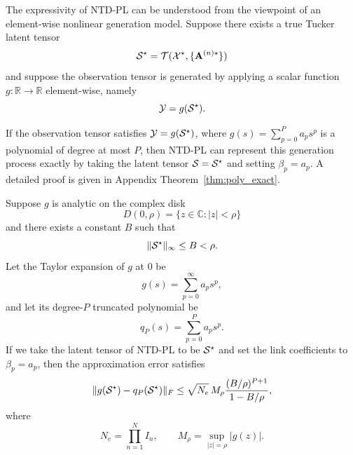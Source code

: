 The expressivity of NTD-PL can be understood from the viewpoint of an element-wise nonlinear generation model. Suppose there exists a true Tucker latent tensor
\begin{equation}
\mathcal{S}^\star
=
\mathcal{T}(\mathcal{X^\star},\{\mathbf{A}^{(n)\star}\})
\end{equation}
and suppose the observation tensor is generated by applying a scalar function $g:\mathbb R\to\mathbb R$ element-wise, namely
\begin{equation}
\mathcal{Y} = g(\mathcal{S}^\star).
\end{equation}

\begin{proposition}
\label{prop:poly_exact_main}
If the observation tensor satisfies $\mathcal{Y} = g(\mathcal{S}^\star)$, where $g(s)=\sum_{p=0}^{P} a_p s^p$ is a polynomial of degree at most $P$, then NTD-PL can represent this generation process exactly by taking the latent tensor $\mathcal{S}=\mathcal{S}^\star$ and setting $\beta_p=a_p$. A detailed proof is given in Appendix Theorem~\ref{thm:poly_exact}.
\end{proposition}

\begin{theorem}
\label{thm:analytic_bound_main}
Suppose $g$ is analytic on the complex disk
\begin{equation}
D(0,\rho)=\{z\in\mathbb C:|z|<\rho\}
\end{equation}
and there exists a constant $B$ such that
\begin{equation}
\|\mathcal{S}^\star\|_\infty \le B < \rho.
\end{equation}
Let the Taylor expansion of $g$ at $0$ be
\begin{equation}
g(s)=\sum_{p=0}^{\infty} a_p s^p,
\end{equation}
and let its degree-$P$ truncated polynomial be
\begin{equation}
q_P(s)=\sum_{p=0}^{P} a_p s^p.
\end{equation}
If we take the latent tensor of NTD-PL to be $\mathcal{S}^\star$ and set the link coefficients to $\beta_p=a_p$, then the approximation error satisfies
\begin{equation}
\|g(\mathcal{S}^\star)-q_P(\mathcal{S}^\star)\|_F
\le
\sqrt{N_e}\,M_\rho
\frac{(B/\rho)^{P+1}}{1-B/\rho},
\label{eq:analytic_bound_main}
\end{equation}
where
\begin{equation}
N_e=\prod_{n=1}^N I_n,
\qquad
M_\rho=\sup_{|z|=\rho}|g(z)|.
\end{equation}
\end{theorem}

